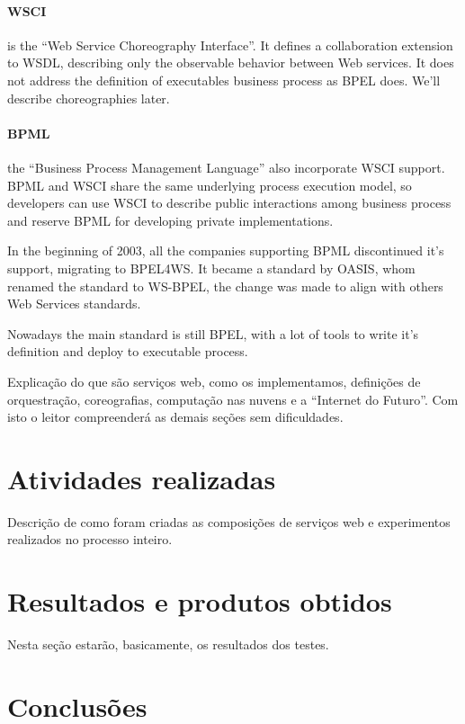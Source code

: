 \documentclass[11pt,a4paper]{article}
\begin{document}
\paragraph{WSCI}
is the ``Web Service Choreography Interface''. It defines a collaboration extension to WSDL, describing only the observable behavior between Web services. It does not address the definition of executables business process as BPEL does. We'll describe choreographies later.

\paragraph{BPML} 
the ``Business Process Management Language'' also incorporate WSCI support. BPML and WSCI share the same underlying process execution model, so developers can use WSCI to describe public interactions among business process and reserve BPML for developing private implementations.

In the beginning of 2003, all the companies supporting BPML discontinued it's support, migrating to BPEL4WS. It became a standard by OASIS, whom renamed the standard to WS-BPEL, the change was made to align with others Web Services standards.

Nowadays the main standard is still BPEL, with a lot of tools to write it's definition and deploy to executable process.





Explicação do que são serviços web, como os implementamos, definições de orquestração, coreografias, computação nas nuvens e a ``Internet do Futuro''. Com isto o leitor compreenderá as demais seções sem dificuldades.




\section{Atividades realizadas}
Descrição de como foram criadas as composições de serviços web e experimentos realizados no processo inteiro.



\section{Resultados e produtos obtidos}
Nesta seção estarão, basicamente, os resultados dos testes.




\section{Conclusões}
\end{document}
